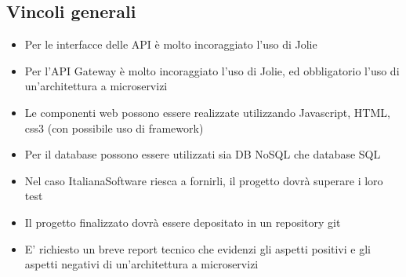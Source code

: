 \subsection{Vincoli generali}
\begin{itemize}
\item Per le interfacce delle API è molto incoraggiato l'uso di Jolie \\
\item Per l'API Gateway è molto incoraggiato l'uso di Jolie, ed obbligatorio l'uso di un'architettura a microservizi \\
\item Le componenti web possono essere realizzate utilizzando Javascript, HTML, css3 (con possibile uso di framework) \\
\item Per il database possono essere utilizzati sia DB NoSQL che database SQL \\
\item Nel caso ItalianaSoftware riesca a fornirli, il progetto dovrà superare i loro test \\
\item Il progetto finalizzato dovrà essere depositato in un repository git \\
\item E' richiesto un breve report tecnico che evidenzi gli aspetti positivi e gli aspetti negativi di un'architettura a microservizi \\
\end{itemize}
